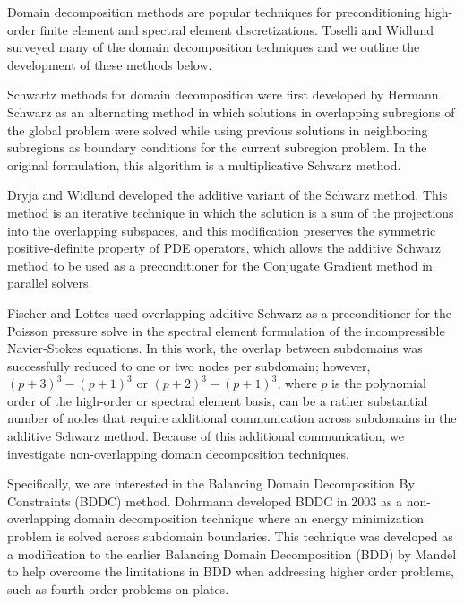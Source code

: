 Domain decomposition methods are popular techniques for preconditioning high-order finite element and spectral element discretizations.
Toselli and Widlund surveyed many of the domain decomposition techniques \cite{toselli2005domain} and we outline the development of these methods below.

Schwartz methods for domain decomposition were first developed by Hermann Schwarz \cite{schwarz1972gesammelte} as an alternating method in which solutions in overlapping subregions of the global problem were solved while using previous solutions in neighboring subregions as boundary conditions for the current subregion problem.
In the original formulation, this algorithm is a multiplicative Schwarz method.

Dryja and Widlund \cite{widlund1987additive,dryja1989additive} developed the additive variant of the Schwarz method.
This method is an iterative technique in which the solution is a sum of the projections into the overlapping subspaces, and this modification preserves the symmetric positive-definite property of PDE operators, which allows the additive Schwarz method to be used as a preconditioner for the Conjugate Gradient method in parallel solvers.

Fischer and Lottes \cite{fischer1997overlapping,fischer2005hybrid} used overlapping additive Schwarz as a preconditioner for the Poisson pressure solve in the spectral element formulation of the incompressible Navier-Stokes equations.
In this work, the overlap between subdomains was successfully reduced to one or two nodes per subdomain; however, $\left( p + 3 \right)^3 - \left( p + 1 \right)^3$ or $\left( p + 2 \right)^3 - \left( p + 1 \right)^3$, where $p$ is the polynomial order of the high-order or spectral element basis, can be a rather substantial number of nodes that require additional communication across subdomains in the additive Schwarz method.
Because of this additional communication, we investigate non-overlapping domain decomposition techniques.

Specifically, we are interested in the Balancing Domain Decomposition By Constraints (BDDC) method.
Dohrmann \cite{dohrmann2003preconditioner} developed BDDC in 2003 as a non-overlapping domain decomposition technique where an energy minimization problem is solved across subdomain boundaries.
This technique was developed as a modification to the earlier Balancing Domain Decomposition (BDD) by Mandel \cite{mandel1993balancing} to help overcome the limitations in BDD when addressing higher order problems, such as fourth-order problems on plates.

